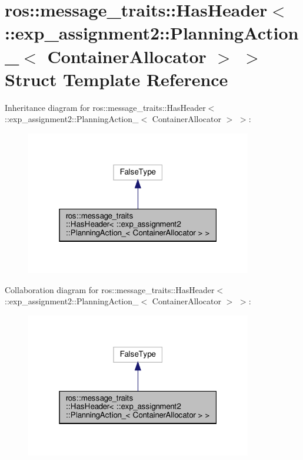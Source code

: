 \hypertarget{structros_1_1message__traits_1_1HasHeader_3_01_1_1exp__assignment2_1_1PlanningAction___3_01ContainerAllocator_01_4_01_4}{}\section{ros\+:\+:message\+\_\+traits\+:\+:Has\+Header$<$ \+:\+:exp\+\_\+assignment2\+:\+:Planning\+Action\+\_\+$<$ Container\+Allocator $>$ $>$ Struct Template Reference}
\label{structros_1_1message__traits_1_1HasHeader_3_01_1_1exp__assignment2_1_1PlanningAction___3_01ContainerAllocator_01_4_01_4}


Inheritance diagram for ros\+:\+:message\+\_\+traits\+:\+:Has\+Header$<$ \+:\+:exp\+\_\+assignment2\+:\+:Planning\+Action\+\_\+$<$ Container\+Allocator $>$ $>$\+:
\nopagebreak
\begin{figure}[H]
\begin{center}
\leavevmode
\includegraphics[width=280pt]{structros_1_1message__traits_1_1HasHeader_3_01_1_1exp__assignment2_1_1PlanningAction___3_01Contab6edfddf0e19669a16f7db2da0a2b230}
\end{center}
\end{figure}


Collaboration diagram for ros\+:\+:message\+\_\+traits\+:\+:Has\+Header$<$ \+:\+:exp\+\_\+assignment2\+:\+:Planning\+Action\+\_\+$<$ Container\+Allocator $>$ $>$\+:
\nopagebreak
\begin{figure}[H]
\begin{center}
\leavevmode
\includegraphics[width=280pt]{structros_1_1message__traits_1_1HasHeader_3_01_1_1exp__assignment2_1_1PlanningAction___3_01Conta6a14d6979592efc68d505394fa54fffe}
\end{center}
\end{figure}


